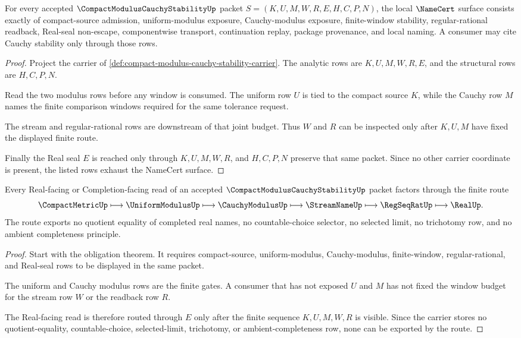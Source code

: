 \begin{theorem}
\label{thm:compact-modulus-cauchy-stability-obligations}
For every accepted $\CompactModulusCauchyStabilityUp$ packet $S=(K,U,M,W,R,E,H,C,P,N)$, the local $\NameCert$ surface consists exactly of compact-source admission, uniform-modulus exposure, Cauchy-modulus exposure, finite-window stability, regular-rational readback, Real-seal non-escape, componentwise transport, continuation replay, package provenance, and local naming. A consumer may cite Cauchy stability only through those rows.
\end{theorem}
\begin{proof}
Project the carrier of \autoref{def:compact-modulus-cauchy-stability-carrier}. The analytic rows are $K,U,M,W,R,E$, and the structural rows are $H,C,P,N$.

Read the two modulus rows before any window is consumed. The uniform row $U$ is tied to the compact source $K$, while the Cauchy row $M$ names the finite comparison windows required for the same tolerance request.

The stream and regular-rational rows are downstream of that joint budget. Thus $W$ and $R$ can be inspected only after $K,U,M$ have fixed the displayed finite route.

Finally the Real seal $E$ is reached only through $K,U,M,W,R$, and $H,C,P,N$ preserve that same packet. Since no other carrier coordinate is present, the listed rows exhaust the NameCert surface.
\end{proof}

\begin{theorem}
\label{thm:compact-modulus-cauchy-stability-finite-route}
Every Real-facing or Completion-facing read of an accepted $\CompactModulusCauchyStabilityUp$ packet factors through the finite route
$$
\CompactMetricUp \longmapsto \UniformModulusUp \longmapsto \CauchyModulusUp \longmapsto \StreamNameUp \longmapsto \RegSeqRatUp \longmapsto \RealUp .
$$
The route exports no quotient equality of completed real names, no countable-choice selector, no selected limit, no trichotomy row, and no ambient completeness principle.
\end{theorem}
\begin{proof}
Start with the obligation theorem. It requires compact-source, uniform-modulus, Cauchy-modulus, finite-window, regular-rational, and Real-seal rows to be displayed in the same packet.

The uniform and Cauchy modulus rows are the finite gates. A consumer that has not exposed $U$ and $M$ has not fixed the window budget for the stream row $W$ or the readback row $R$.

The Real-facing read is therefore routed through $E$ only after the finite sequence $K,U,M,W,R$ is visible. Since the carrier stores no quotient-equality, countable-choice, selected-limit, trichotomy, or ambient-completeness row, none can be exported by the route.
\end{proof}


